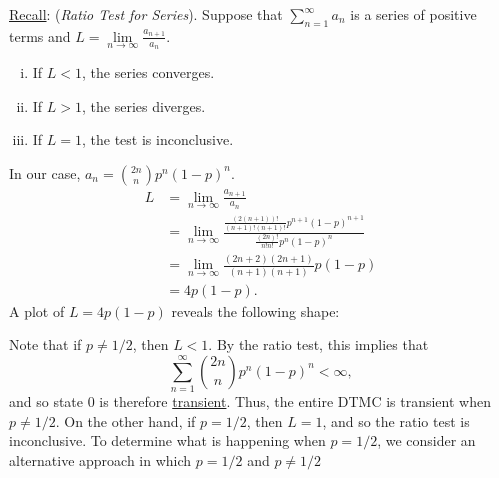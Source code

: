 \begin{Example}
    \underline{Recall}: (\emph{Ratio Test for Series}).
    Suppose that $ \sum_{n=1}^{\infty} a_n $ is a series of positive
    terms and $ L=\lim\limits_{{n} \to {\infty}} \frac{a_{n+1}}{a_n} $.
    \begin{enumerate}[(i)]
        \item If $ L<1 $, the series converges.
        \item If $ L>1 $, the series diverges.
        \item If $ L=1 $, the test is inconclusive.
    \end{enumerate}
    In our case, $ a_n=\binom{2n}{n}p^n(1-p)^n $.
    \begin{align*}
        L
         & =\lim\limits_{{n} \to {\infty}} \frac{a_{n+1}}{a_n}                                                                    \\
         & =\lim\limits_{{n} \to {\infty}} \frac{\frac{(2(n+1))!}{(n+1)!(n+1)!}p^{n+1}(1-p)^{n+1}}{\frac{(2n)!}{n!n!}p^n (1-p)^n} \\
         & =\lim\limits_{{n} \to {\infty}} \frac{(2n+2)(2n+1)}{(n+1)(n+1)} p(1-p)                                                 \\
         & =4p(1-p).
    \end{align*}
    A plot of $ L=4p(1-p) $ reveals the following shape:
    \begin{center}
    \end{center}
    Note that if $ p\ne 1/2 $, then $ L<1 $. By the ratio test, this implies that
    \[ \sum_{n=1}^{\infty} \binom{2n}{n}p^n(1-p)^n<\infty, \]
    and so state $0$ is therefore \underline{transient}. Thus, the entire DTMC
    is transient when $ p\ne 1/2 $.
    On the other hand, if $ p=1/2 $, then $ L=1 $, and so the ratio test is
    inconclusive. To determine what is happening when $ p=1/2 $,
    we consider an alternative approach in which $ p=1/2 $ and $ p\ne 1/2 $

\end{Example}
